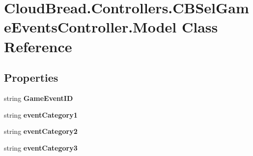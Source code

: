 \hypertarget{class_cloud_bread_1_1_controllers_1_1_c_b_sel_game_events_controller_1_1_model}{}\section{Cloud\+Bread.\+Controllers.\+C\+B\+Sel\+Game\+Events\+Controller.\+Model Class Reference}
\label{class_cloud_bread_1_1_controllers_1_1_c_b_sel_game_events_controller_1_1_model}
\subsection*{Properties}
\begin{DoxyCompactItemize}
\item 
string {\bfseries Game\+Event\+ID}\hypertarget{class_cloud_bread_1_1_controllers_1_1_c_b_sel_game_events_controller_1_1_model_a81caaf7dbab2694c6b06a49de7cd41e2}{}\label{class_cloud_bread_1_1_controllers_1_1_c_b_sel_game_events_controller_1_1_model_a81caaf7dbab2694c6b06a49de7cd41e2}

\item 
string {\bfseries event\+Category1}\hypertarget{class_cloud_bread_1_1_controllers_1_1_c_b_sel_game_events_controller_1_1_model_a18dbb87c27a859c7b3244aa556dfb7ed}{}\label{class_cloud_bread_1_1_controllers_1_1_c_b_sel_game_events_controller_1_1_model_a18dbb87c27a859c7b3244aa556dfb7ed}

\item 
string {\bfseries event\+Category2}\hypertarget{class_cloud_bread_1_1_controllers_1_1_c_b_sel_game_events_controller_1_1_model_a8ad17906f474bd201b4a3f528cb40dda}{}\label{class_cloud_bread_1_1_controllers_1_1_c_b_sel_game_events_controller_1_1_model_a8ad17906f474bd201b4a3f528cb40dda}

\item 
string {\bfseries event\+Category3}\hypertarget{class_cloud_bread_1_1_controllers_1_1_c_b_sel_game_events_controller_1_1_model_a51b3dadf3d63ea8f0392b5438fb24f19}{}\label{class_cloud_bread_1_1_controllers_1_1_c_b_sel_game_events_controller_1_1_model_a51b3dadf3d63ea8f0392b5438fb24f19}


\end{DoxyCompactItemize}
